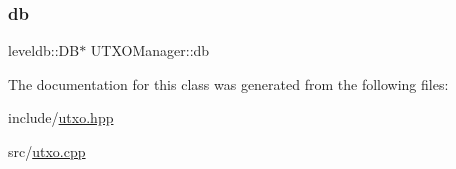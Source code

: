 \subsubsection{\texorpdfstring{db}{db}}
{\footnotesize\ttfamily leveldb\+::\+DB$\ast$ U\+T\+X\+O\+Manager\+::db\hspace{0.3cm}{\ttfamily [private]}}



The documentation for this class was generated from the following files\+:\begin{DoxyCompactItemize}
\item 
include/\mbox{\hyperlink{utxo_8hpp}{utxo.\+hpp}}\item 
src/\mbox{\hyperlink{utxo_8cpp}{utxo.\+cpp}}\end{DoxyCompactItemize}
